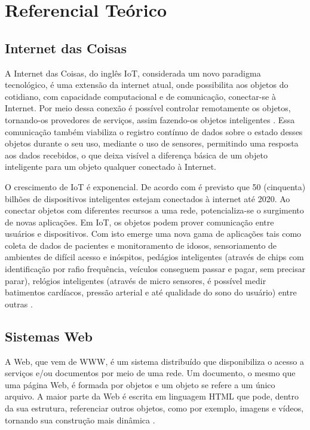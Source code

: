 \chapter{Referencial Teórico}
\label{Referencial_Teorico}

\section{Internet das Coisas}%

A Internet das Coisas, do inglês \acf{IoT}, considerada um novo paradigma tecnológico, é uma extensão da internet atual, onde possibilita aos objetos do cotidiano, com capacidade computacional e de comunicação, conectar-se à Internet. Por meio dessa conexão é possível controlar remotamente os objetos, tornando-os provedores de serviços, assim fazendo-os objetos inteligentes \citep{Mancini2017}. Essa comunicação também viabiliza o registro contínuo de dados sobre o estado desses objetos durante o seu uso, mediante o uso de sensores, permitindo uma resposta aos dados recebidos, o que deixa visível a diferença básica de um objeto inteligente para um objeto qualquer conectado à Internet. 

O crescimento de IoT é exponencial. De acordo com \cite{Evan2011} é previsto que 50 (cinquenta) bilhões de dispositivos inteligentes estejam conectados à internet até 2020. Ao conectar objetos com diferentes recursos a uma rede, potencializa-se o surgimento de novas aplicações. Em IoT, os objetos podem prover comunicação entre usuários e dispositivos. Com isto emerge uma nova gama de aplicações tais como coleta de dados de pacientes e monitoramento de idosos, sensoriamento de ambientes de difícil acesso e inóspitos, pedágios inteligentes (através de chips com identificação por rafio frequência, veículos conseguem passar e pagar, sem precisar parar), relógios inteligentes (através de micro sensores, é possível medir batimentos cardíacos, pressão arterial e até qualidade do sono do usuário) entre outras \citep{Sundmaeker2010}. 


\section{Sistemas Web}%

A Web, que vem de \acf{WWW}, é um sistema distribuído que disponibiliza o acesso a serviços e/ou documentos por meio de uma rede. Um documento, o mesmo que uma página Web, é formada por objetos e um objeto se refere a um único arquivo. A maior parte da Web é escrita em linguagem \acf{HTML} que pode, dentro da sua estrutura, referenciar outros objetos, como por exemplo, imagens e vídeos, tornando sua construção mais dinâmica \citep{tanenbaum2008sistemas,kurose2014redesdecomputadores}. 

